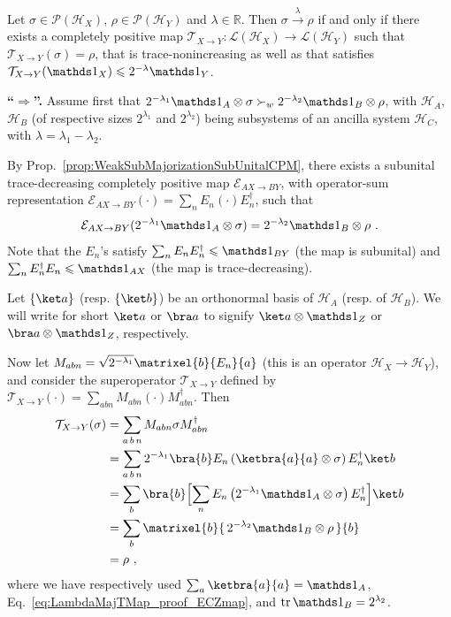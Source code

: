 \documentclass[12pt,a4paper]{article}
\def\Hs{\mathscr{H}}%
\newenvironment{myproof}[1][\proofname]{%
  \color{prooftextcolor} \footnotesize \proof[\itshape #1]\hspace*{1.2mm}%
}{\endproof}
\newcommand{\lambdamaj}[1]{\xrightarrow{#1}}
\newcommand{\LOps}{\mathscr{L}}
\newcommand{\POps}{\mathscr{P}}
\begin{document}
\begin{prop}
  \label{prop:LambdaMajorizationTMap}
  Let $\sigma\in\POps(\Hs_X)$, $\rho\in\POps(\Hs_Y)$ and $\lambda\in\mathbb R$. Then $\sigma\lambdamaj\lambda\rho$
  if and only if there exists a completely positive map
  $\mathcal T_{X\rightarrow Y} : \LOps(\Hs_X) \rightarrow \LOps(\Hs_Y)$ such
  that $\mathcal{T}_{X\rightarrow Y}(\sigma) = \rho$, that is trace-nonincreasing as well as that satisfies
  $\mathcal{T}_{X\rightarrow Y}(\Ident_X)\leqslant 2^{-\lambda}\Ident_Y$.
\end{prop}

\begin{myproof}[Proof of Prop.~\ref{prop:LambdaMajorizationTMap}]
  {\bf ``$\boldsymbol\Rightarrow$''.} \hspace*{1.5mm}
  Assume first that $2^{-\lambda_1}\Ident_A\otimes\sigma \succ_w 2^{-\lambda_2}\Ident_B\otimes\rho$, with
  $\Hs_A$, $\Hs_B$ (of respective sizes $2^{\lambda_1}$ and $2^{\lambda_2}$) being subsystems of an ancilla
  system $\Hs_C$, with $\lambda=\lambda_1-\lambda_2$.

  By Prop.~\ref{prop:WeakSubMajorizationSubUnitalCPM}, there exists a subunital trace-decreasing
  completely positive map $\mathcal{E}_{AX\rightarrow BY}$, with operator-sum representation
  $\mathcal{E}_{AX\rightarrow BY}(\cdot) = \sum_n E_n\left(\cdot\right)E_n^\dagger$, such that
  \begin{align}
    \label{eq:LambdaMajTMap_proof_ECZmap}
    \mathcal{E}_{AX\rightarrow BY}(2^{-\lambda_1}\Ident_A\otimes\sigma) = 2^{-\lambda_2}\Ident_B\otimes\rho\ .
  \end{align}
  Note that the $E_n$'s satisfy $\sum_n E_n E_n^\dagger \leqslant \Ident_{BY}$ (the map is subunital) and
  $\sum_n E_n^\dagger E_n \leqslant \Ident_{AX}$ (the map is trace-decreasing).

  Let $\{\ket a\}$ (resp. $\{\ket b\}$) be an orthonormal basis of $\Hs_A$ (resp. of $\Hs_B$). We will write
  for short $\ket a$ or $\bra a$ to signify $\ket a \otimes \Ident_Z$ or $\bra a \otimes \Ident_Z$, respectively.

  Now let $M_{abn} = \sqrt{2^{-\lambda_1}} \matrixel{b}{ E_n }{a}$ (this is an operator $\Hs_X\rightarrow\Hs_Y$),
  and consider the superoperator $\mathcal{T}_{X\rightarrow Y}$ defined by
  $\mathcal{T}_{X\rightarrow Y}(\cdot) = \sum_{abn} M_{abn}\left(\cdot\right)M_{abn}^\dagger$.
  Then
  \begin{align*}
    \mathcal{T}_{X\rightarrow Y}(\sigma) &= \sum_{a\,b\,n} M_{abn}\sigma M_{abn}^\dagger \\
    &= \sum_{a\,b\,n}  2^{-\lambda_1} \bra{b} E_n \left(\ketbra{a}{a}\otimes\sigma\right) E_n^\dagger \ket b \\
    &= \sum_{b}\bra{b} \Bigl[\sum_n E_n \left( 2^{-\lambda_1}\Ident_A\otimes\sigma\right) E_n^\dagger \Bigr] \ket b\\
    &= \sum_{b} \matrixel{b}{ \, 2^{-\lambda_2}\Ident_B\otimes\rho \, }{b} \\
    &= \rho\ ,
  \end{align*}
  where we have respectively used $\sum_a \ketbra{a}{a} = \Ident_A$, Eq.~\eqref{eq:LambdaMajTMap_proof_ECZmap},
  and $\tr \Ident_B = 2^{\lambda_2}$.


\end{myproof}
\end{document}
